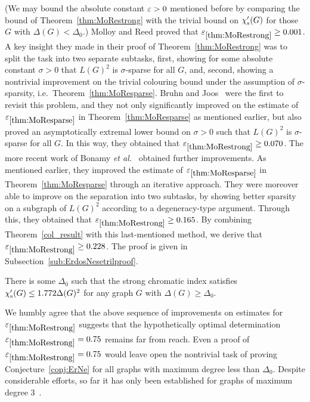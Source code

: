 \noindent
(We may bound the absolute constant $\varepsilon>0$ mentioned before by comparing the bound of Theorem~\ref{thm:MoRestrong} with the trivial bound on $\chi'_{\operatorname{s}}(G)$ for those $G$ with $\Delta(G)<\Delta_0$.)
Molloy and Reed proved that $\varepsilon_{\ref{thm:MoRestrong}} \ge 0.001$.
A key insight they made in their proof of Theorem~\ref{thm:MoRestrong} was to split the task into two separate subtasks, first, showing for some absolute constant $\sigma>0$ that $L(G)^2$ is $\sigma$-sparse for all $G$, and, second, showing a nontrivial improvement on the trivial colouring bound under the assumption of $\sigma$-sparsity, i.e.~Theorem~\ref{thm:MoResparse}.
Bruhn and Joos~\cite{BrJo18} were the first to revisit this problem, and they not only significantly improved on the estimate of $\varepsilon_{\ref{thm:MoResparse}}$ in Theorem~\ref{thm:MoResparse} as mentioned earlier, but also proved an asymptotically extremal lower bound on $\sigma>0$ such that $L(G)^2$ is $\sigma$-sparse for all $G$. In this way, they obtained that $\varepsilon_{\ref{thm:MoRestrong}} \ge 0.070$.
The more recent work of Bonamy {\em et al.}~\cite{BPP18+} obtained further improvements. As mentioned earlier, they improved the estimate of $\varepsilon_{\ref{thm:MoResparse}}$ in Theorem~\ref{thm:MoResparse} through an iterative approach. They were moreover able to improve on the separation into two subtasks, by showing better sparsity on a subgraph of $L(G)^2$ according to a degeneracy-type argument. Through this, they obtained that $\varepsilon_{\ref{thm:MoRestrong}} \ge 0.165$.
By combining Theorem~\ref{col_result} with this last-mentioned method, we derive that $\varepsilon_{\ref{thm:MoRestrong}} \ge 0.228$. The proof is given in Subsection~\ref{sub:ErdosNesetrilproof}.

\begin{theorem}
\label{strong_bound}
There is some $\Delta_0$ such that the strong chromatic index satisfies $\chi'_{\operatorname{s}}(G)\leq 1.772\Delta(G)^2$ for any graph $G$ with $\Delta(G)\ge \Delta_0$.
\end{theorem}

\noindent
We humbly agree that the above sequence of improvements on estimates for $\varepsilon_{\ref{thm:MoRestrong}}$ suggests that the hypothetically optimal determination $\varepsilon_{\ref{thm:MoRestrong}}=0.75$ remains far from reach. Even a proof of $\varepsilon_{\ref{thm:MoRestrong}}=0.75$ would leave open the nontrivial task of proving Conjecture~\ref{conj:ErNe} for all graphs with maximum degree less than $\Delta_0$. Despite considerable efforts, so far it has only been established for graphs of maximum degree $3$~\cite{And92,HQT93}.




